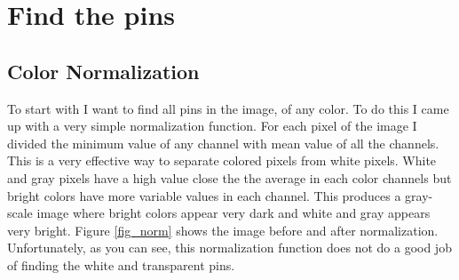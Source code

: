 \documentclass[12pt]{article}
\begin{document}
\section{Find the pins}

\subsection{Color Normalization}
To start with I want to find all pins in the image, of any color. To do this I came up with a very simple normalization function. For each pixel of the image I divided the minimum value of any channel with mean value of all the channels. This is a very effective way to separate colored pixels from white pixels. White and gray pixels have a high value close the the average in each color channels but bright colors have more variable values in each channel. This produces a gray-scale image where bright colors appear very dark and white and gray appears very bright. Figure \ref{fig_norm} shows the image before and after normalization.
Unfortunately, as you can see, this normalization function does not do a good job of finding the white and transparent pins.
\end{document}
